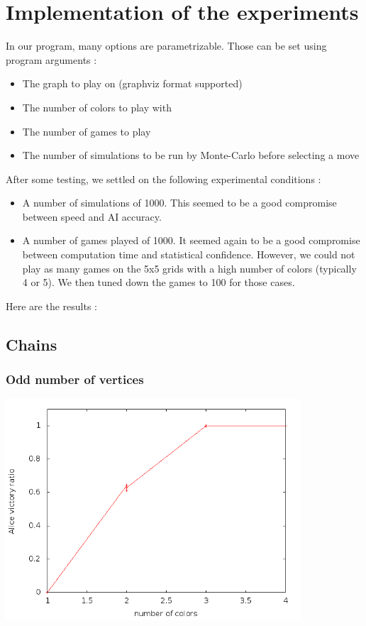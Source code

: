 \section{Implementation of the experiments}


In our program, many options are parametrizable. Those can be set using program arguments :
\begin{itemize}
\item The graph to play on (graphviz format supported)
\item The number of colors to play with
\item The number of games to play
\item The number of simulations to be run by Monte-Carlo before selecting a move
\end{itemize}
After some testing, we settled on the following experimental conditions :
\begin{itemize}
\item A number of simulations of 1000. This seemed to be a good compromise between speed and AI accuracy.
\item A number of games played of 1000. It seemed again to be a good compromise between computation time and statistical confidence. However, we could not play as many games on the 5x5 grids with a high number of colors (typically 4 or 5). We then tuned down the games to 100 for those cases. 
\end{itemize}

Here are the results :\\

\subsection{Chains}

\subsubsection{Odd number of vertices}

\includegraphics[width=11cm]{resultats/chaineimpaire.png}

